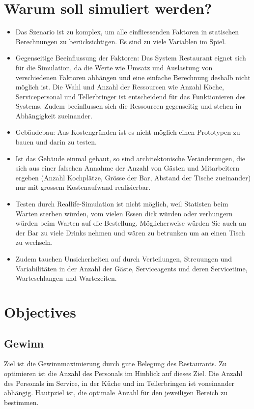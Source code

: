 \documentclass[ngerman,a4paper,12pt]{scrreprt}
\begin{document}
\section{Warum soll simuliert werden?}
	\begin{itemize}
		\item Das Szenario ist zu komplex, um alle einfliessenden Faktoren in statischen Berechnungen zu berücksichtigen. Es sind zu  viele Variablen im Spiel.
		\item Gegenseitige Beeinflussung der Faktoren: Das System Restaurant eignet sich für die Simulation, da die Werte wie Umsatz und Auslastung von verschiedenen Faktoren abhängen und eine einfache Berechnung deshalb nicht möglich ist. Die Wahl und Anzahl der Ressourcen wie Anzahl Köche, Servicepersonal und Tellerbringer ist entscheidend für das Funktionieren des Systems. Zudem beeinflussen sich die Ressourcen gegenseitig und stehen in Abhängigkeit zueinander.
		\item Gebäudebau: Aus Kostengründen ist es nicht möglich einen Prototypen zu bauen und darin zu testen.
		\item Ist das Gebäude einmal gebaut, so sind  architektonische Veränderungen, die sich aus einer falschen Annahme der Anzahl von Gästen und Mitarbeitern ergeben (Anzahl Kochplätze, Grösse der Bar, Abstand der Tische zueinander) nur mit grossem Kostenaufwand realisierbar.
		\item Testen durch Reallife-Simulation ist nicht möglich, weil Statisten beim Warten sterben würden, vom vielen Essen dick würden oder verhungern würden beim Warten auf die Bestellung. Möglicherweise würden Sie auch an der Bar zu viele Drinks nehmen und wären zu betrunken um an einen Tisch zu wechseln.
		\item Zudem tauchen Unsicherheiten auf durch Verteilungen,  Streuungen und Variabilitäten in der Anzahl der Gäste, Serviceagents und deren Servicetime, Warteschlangen und Wartezeiten.
	\end{itemize}

\section{Objectives}
	\subsection{Gewinn}
	Ziel ist die Gewinnmaximierung durch gute Belegung des Restaurants. Zu optimieren ist die Anzahl des Personals im Hinblick auf dieses Ziel. Die Anzahl des Personals im Service, in der Küche und im Tellerbringen ist voneinander abhängig. Hautpziel ist, die optimale Anzahl für den jeweiligen Bereich zu bestimmen. 
\end{document}
